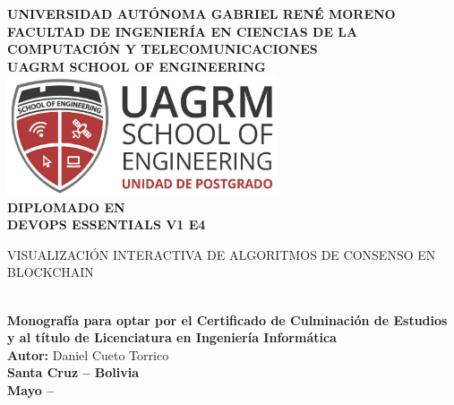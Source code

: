 \documentclass[spanish,12pt,letterpaper]{report}
\begin{document}
\sloppy 



\begin{titlepage}
\centering %


{\Large\bfseries UNIVERSIDAD AUTÓNOMA GABRIEL RENÉ MORENO}\\[0.5cm]
{\normalsize\bfseries FACULTAD DE INGENIERÍA EN CIENCIAS DE LA COMPUTACIÓN Y TELECOMUNICACIONES}\\[0.3cm]
{\normalsize\bfseries UAGRM SCHOOL OF ENGINEERING}\\[1cm]

\includegraphics[width=8cm]{logo-postgrado.png}\\[1cm]

{\Large\bfseries DIPLOMADO EN}\\[0.2cm] 
{\Large\bfseries DEVOPS ESSENTIALS V1 E4}\\[1.6cm] 

{\LARGE\bfseries\begin{minipage}{0.9\textwidth}\centering
VISUALIZACIÓN INTERACTIVA DE ALGORITMOS DE CONSENSO EN BLOCKCHAIN
\end{minipage}}\\[1.5cm]

{\large\bfseries Monografía para optar por el Certificado de Culminación de Estudios y al título de Licenciatura en Ingeniería Informática}\\[1.2cm]
{\large\bfseries Autor:} {\large Daniel Cueto Torrico}\\[0.5cm]

{\large\bfseries Santa Cruz – Bolivia}\\[0.2cm]
{\large\bfseries Mayo – \the\year}
\end{titlepage}
\end{document}
